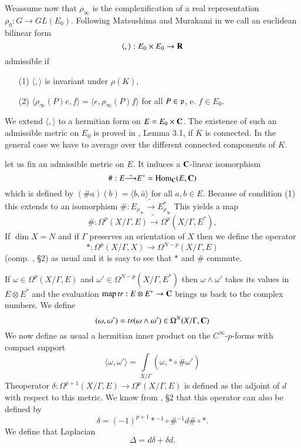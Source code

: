 We\pageoriginale assume now that $\rho_\infty$ is the complexification of a real representation $\rho_0 : G \to G L (E_0)$. Following Matsushima and Murakami in \cite{art5-key10} we call an euclidean bilinear form
$$
\langle, \rangle : E_0 \times E_0 \to \mathbf{R}
$$
admissible if 
\begin{itemize}
\item[(1)] $\langle, \rangle$ is invariant under $\rho (K)$, 

\item[(2)] $\langle \rho_\infty (P) e, f \rangle = \langle e, \rho_\infty (P) f \rangle$ for all $P \in \mathfrak{p}$, e. $f \in E_0$.
\end{itemize}
We extend $\langle , \rangle$ to a hermitian form on $E = E_0 \times \mathbf{C}$. The existence of such an admissible metric on $E_0$ is proved in \cite{art5-key10}, Lemma 3.1, if $K$ is connected. In the general case we have to average over the different connected components of $K$.


let us fix an admissible metric on $E$. It induces a $\mathbf{C}$-linear isomorphism
$$
\# : E \tilde{\longrightarrow} E^\ast = \operatorname{Hom}_{\mathbf{C}} (E, \mathbf{C})
$$
which is defined by $(\# a) (b) = \langle b, \bar{a} \rangle$ for all $a, b \in E$. Because of condition (1) this extends to an isomorphism $\# : E_{\rho_\infty} \tilde{\longrightarrow} E^\ast_{\rho_\infty}$ This yields a map
\setcounter{equation}{4}
\begin{equation}
\# : \Omega^p (X/ \Gamma, E) \tilde{\longrightarrow} \Omega^p (X/ \Gamma, E^\ast) , \label{art5-eq1.5}
\end{equation}
If $\dim X =N$ and if $\Gamma$ preserves an orientation of $X$ then we define the operator 
\begin{equation}
\ast : \Omega^p (X / \Gamma, X) \longrightarrow \Omega^{N-p} (X/ \Gamma, E) \label{art5-eq1.6}
\end{equation}
(comp. \cite{art5-key10}, \S2) as usual and it is easy to see that $\ast$ and $\#$ commute.

If $\omega \in \Omega^p (X / \Gamma , E)$ and $\omega' \in \Omega^{N-p} (X/ \Gamma, E^\ast)$ then $\omega \wedge \omega'$ takes its values in $E \otimes E^\ast$ and the evaluation $\operatorname{map} tr : E \otimes E^\ast \to \mathbf{C}$ brings us back to the complex numbers. We define
\begin{equation}
(\omega, \omega') = tr (\omega \wedge \omega') \in \Omega^N (X/ \Gamma, \mathbf{C})
\label{art5-eq1.7}
\end{equation}
We now define as usual a hermitian inner product on the $C^\infty$-$p$-forms with compact support
$$
\langle \omega, \omega' \rangle = \int\limits_{X/ \Gamma} (\omega, \overline{\ast \circ \# \omega'})
$$
The\pageoriginale operator $\delta: \Omega^{p+1} (X/ \Gamma, E) \to \Omega^p (X/ \Gamma, E)$  is defined as the adjoint of $d$ with respect to this metric. We know from \cite{art5-key10}, \S 2 that this operator can also be defined by 
$$
\delta = (-1)^{p+1} \ast {}^{-1} \circ \# {}^{-1} d \# \circ \ast .
$$
We define that Laplacian
$$
\Delta = d \delta + \delta d.
$$

